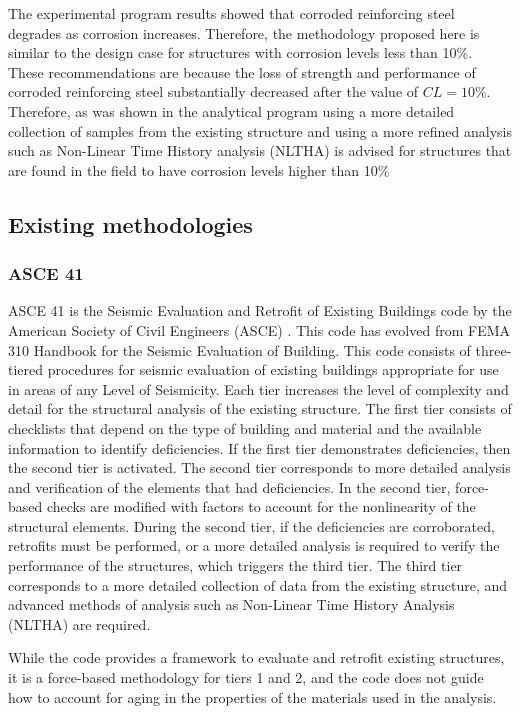 The experimental program results showed that corroded reinforcing steel degrades as corrosion increases. Therefore, the methodology proposed here is similar to the design case for structures with corrosion levels less than 10\%. These recommendations are because the loss of strength and performance of corroded reinforcing steel substantially decreased after the value of $CL=10\%$. Therefore, as was shown in the analytical program using a more detailed collection of samples from the existing structure and using a more refined analysis such as Non-Linear Time History analysis (NLTHA) is advised for structures that are found in the field to have corrosion levels higher than 10\%

\subsection{Existing methodologies}

\subsubsection{ASCE 41}

ASCE 41 is the Seismic Evaluation and Retrofit of Existing Buildings code by the American Society of Civil Engineers (ASCE) \cite{ASCE-41-2017}. This code has evolved from FEMA 310 Handbook for the Seismic Evaluation of Building. This code consists of three-tiered procedures for seismic evaluation of existing buildings appropriate for use in areas of any Level of Seismicity. Each tier increases the level of complexity and detail for the structural analysis of the existing structure. The first tier consists of checklists that depend on the type of building and material and the available information to identify deficiencies. If the first tier demonstrates deficiencies, then the second tier is activated. The second tier corresponds to more detailed analysis and verification of the elements that had deficiencies. In the second tier, force-based checks are modified with factors to account for the nonlinearity of the structural elements. During the second tier, if the deficiencies are corroborated, retrofits must be performed, or a more detailed analysis is required to verify the performance of the structures, which triggers the third tier. The third tier corresponds to a more detailed collection of data from the existing structure, and advanced methods of analysis such as Non-Linear Time History Analysis (NLTHA) are required.

While the code provides a framework to evaluate and retrofit existing structures, it is a force-based methodology for tiers 1 and 2, and the code does not guide how to account for aging in the properties of the materials used in the analysis. 

